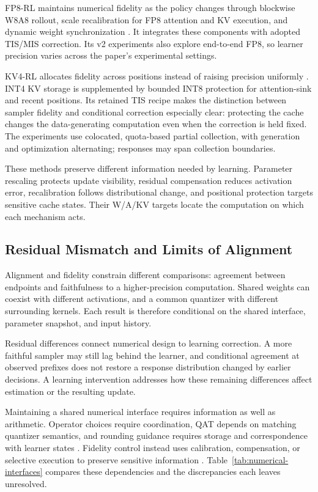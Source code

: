 FP8-RL maintains numerical fidelity as the policy changes through blockwise W8A8 rollout, scale recalibration for FP8 attention and KV execution, and dynamic weight synchronization \citep{fp8rl}. It integrates these components with adopted TIS/MIS correction. Its v2 experiments also explore end-to-end FP8, so learner precision varies across the paper's experimental settings.

KV4-RL allocates fidelity across positions instead of raising precision uniformly \citep{kv4}. INT4 KV storage is supplemented by bounded INT8 protection for attention-sink and recent positions. Its retained TIS recipe makes the distinction between sampler fidelity and conditional correction especially clear: protecting the cache changes the data-generating computation even when the correction is held fixed. The experiments use colocated, quota-based partial collection, with generation and optimization alternating; responses may span collection boundaries.

These methods preserve different information needed by learning. Parameter rescaling protects update visibility, residual compensation reduces activation error, recalibration follows distributional change, and positional protection targets sensitive cache states. Their W/A/KV targets locate the computation on which each mechanism acts.

\subsection{Residual Mismatch and Limits of Alignment}
Alignment and fidelity constrain different comparisons: agreement between endpoints and faithfulness to a higher-precision computation. Shared weights can coexist with different activations, and a common quantizer with different surrounding kernels. Each result is therefore conditional on the shared interface, parameter snapshot, and input history.

Residual differences connect numerical design to learning correction. A more faithful sampler may still lag behind the learner, and conditional agreement at observed prefixes does not restore a response distribution changed by earlier decisions. A learning intervention addresses how these remaining differences affect estimation or the resulting update.

Maintaining a shared numerical interface requires information as well as arithmetic. Operator choices require coordination, QAT depends on matching quantizer semantics, and rounding guidance requires storage and correspondence with learner states \citep{jet,qarl,quads,trace}. Fidelity control instead uses calibration, compensation, or selective execution to preserve sensitive information \citep{qurl,fp8rl,kv4}. Table~\ref{tab:numerical-interfaces} compares these dependencies and the discrepancies each leaves unresolved.

